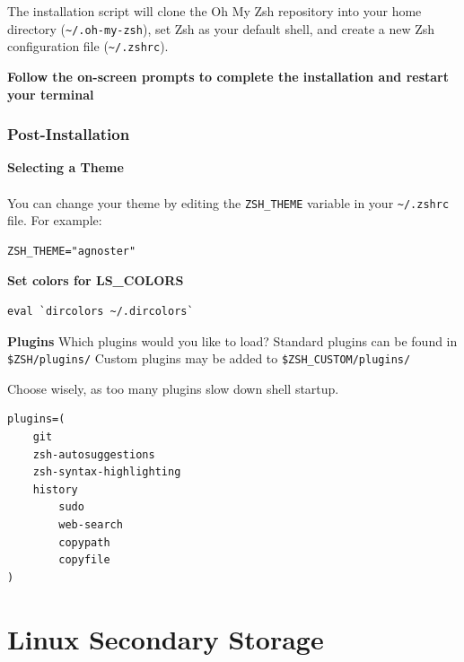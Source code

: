 \documentclass{article}
\newenvironment{blocktemplate}[1]{%
    \tcolorbox[beamer,%
    noparskip,breakable,
    colframe=Blue,%
    colbacklower=LimeGreen!75!LightGreen,%
    title=#1]}%
    {\endtcolorbox}
\newenvironment{codetemplate}[1][]{%
  \mybasecolorbox[#1]
  \itshape
}{%
  \endmybasecolorbox
}
\begin{document}
The installation script will clone the Oh My Zsh repository into your home directory (\verb|~/.oh-my-zsh|), set Zsh as your default shell, and create a new Zsh configuration file (\verb|~/.zshrc|).

\textbf{Follow the on-screen prompts to complete the installation and restart your terminal}

\subsubsection{Post-Installation}

\textbf{Selecting a Theme}
\\\\
You can change your theme by editing the \verb|ZSH_THEME| variable in your \verb|~/.zshrc| file. For example:
\begin{codetemplate}
\begin{verbatim}
ZSH_THEME="agnoster"
\end{verbatim}
\end{codetemplate}

\textbf{Set colors for LS\_COLORS}
\begin{codetemplate}
\begin{verbatim}
eval `dircolors ~/.dircolors`
\end{verbatim}
\end{codetemplate}

\textbf{Plugins}
Which plugins would you like to load? Standard plugins can be found in \verb|$ZSH/plugins/|
Custom plugins may be added to \verb|$ZSH_CUSTOM/plugins/|

\begin{blocktemplate}{NOTE}
Choose wisely, as too many plugins slow down shell startup.
\end{blocktemplate}

\begin{codetemplate}
\begin{verbatim}
plugins=(
    git
    zsh-autosuggestions
    zsh-syntax-highlighting
    history
        sudo
        web-search
        copypath
        copyfile
)
\end{verbatim}
\end{codetemplate}


\newpage
\section{Linux Secondary Storage}
\end{document}
